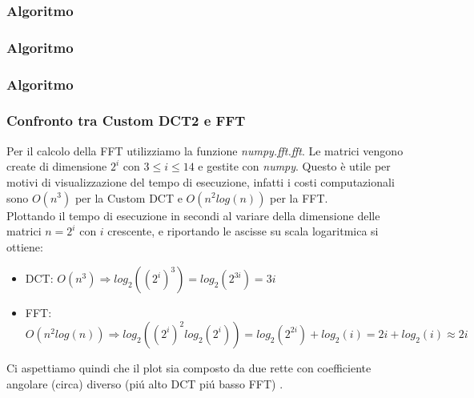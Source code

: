\documentclass{beamer}
\begin{document}
\begin{frame}
\frametitle{Algoritmo}
	
\end{frame}

\begin{frame}
\frametitle{Algoritmo}
	
\end{frame}

\begin{frame}
\frametitle{Algoritmo}
	
\end{frame}

\begin{frame}
	\frametitle{Confronto tra Custom DCT2 e FFT}
	Per il calcolo della FFT utilizziamo la funzione \textit{numpy.fft.fft}. Le matrici vengono create di dimensione $2^i$ con $3\leq i \leq 14$ e gestite con \textit{numpy}. Questo è utile per motivi di visualizzazione del tempo di esecuzione, infatti i costi computazionali sono $O(n^3)$ per la Custom DCT e $O(n^2log(n))$ per la FFT.\\
	Plottando il tempo di esecuzione in secondi al variare della dimensione delle matrici $n = 2^i$ con $i$ crescente, e riportando le ascisse su scala logaritmica si ottiene:\\
	\begin{itemize}
		\item DCT: $O(n^3) \Rightarrow log_2((2^i)^3) =  log_2(2^{3i}) = 3i $
		\item FFT: $O(n^2log(n)) \Rightarrow log_2((2^i)^2 log_2(2^i)) =  log_2(2^{2i}) + log_2(i) = 2i + log_2(i) \approx 2i$
	\end{itemize}
	Ci aspettiamo quindi che il plot sia composto da due rette con coefficiente angolare (circa) diverso (pi\'u alto DCT pi\'u basso FFT) .
\end{frame}
\end{document}
